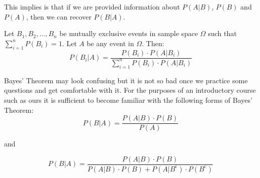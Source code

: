 \noindent
This implies is that if we are provided information about $P(A|B)$, $P(B)$ and $P(A)$, then we can recover $P(B|A)$.


\hfill
\begin{thm}
Let $B_{1}, B_{2}, \ldots, B_{n}$ be mutually exclusive events in sample space $\Omega$ such that 
$\displaystyle \sum_{i = 1}^{n} P(B_{i}) = 1$. Let $A$ be any event in $\Omega$. Then:
	\begin{equation}
	P(B_{i} | A)	=	\frac{ P(B_{i}) \cdot P( A | B_{i}) }{ \displaystyle\sum_{i=1}^{n} P(B_{i}) \cdot P(A | B_{i}) }
	\end{equation}
\end{thm}

Bayes' Theorem may look confusing but it is not so bad once we practice some questions
and get comfortable with it.
For the purposes of an introductory course such as ours it is sufficient to
become familiar with the following forms of Bayes' Theorem:
	\begin{equation}
	P(B | A) = \frac{ P(A|B) \cdot P(B) }{P(A)}
	\end{equation}

\noindent
and

	\begin{equation}
	P(B | A) = \frac{ P(A|B) \cdot P(B) }{ P(A|B) \cdot P(B)  + P(A|B^{\text{c} } ) \cdot P(B^{\text{c} }) }
	\end{equation}

